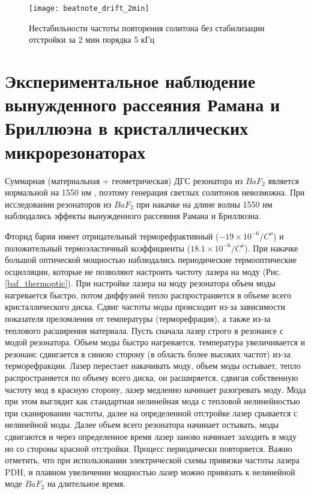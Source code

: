 \begin{figure}[ht]
\centering
  \texttt{[image: beatnote\_drift\_2min]}
  \caption{Нестабильности частоты повторения солитона без стабилизации отстройки за 2 мин порядка 5 кГц}
  \label{beatnote_drift_2min}
\end{figure}



\section{Экспериментальное наблюдение вынужденного рассеяния Рамана и Бриллюэна в кристаллических микрорезонаторах}

Суммарная (материальная + геометрическая) ДГС резонатора из $BaF_2$ является нормальной на 1550 нм \cite{}, поэтому генерация светлых солитонов невозможна. При исследовании резонаторов из $BaF_2$ при накачке на длине волны 1550 нм наблюдались эффекты вынужденного рассеяния Рамана и Бриллюэна.

Фторид бария имеет отрицательный терморефрактивный ($-19\times10^{-6}/C^{o}$) и положительный термоэластичный коэффициенты ($18.1\times10^{-6}/C^{o}$). При накачке большой оптической мощностью наблюдались периодические термооптические осцилляции, которые не позволяют настроить частоту лазера на моду (Рис. \ref{baf_thermoptic}). При настройке лазера на моду резонатора объем моды нагревается быстро, потом диффузией тепло распространяется в объеме всего кристаллического диска. Сдвиг частоты моды происходит из-за зависимости показателя преломления от температуры (терморефрация), а также из-за теплового расширения материала. Пусть сначала лазер строго в резонансе с модой резонатора. Объем моды быстро нагревается, температура увеличивается и резонанс сдвигается в синюю сторону (в область более высоких частот) из-за терморефракции. Лазер перестает накачивать моду, объем моды остывает, тепло распространяется по объему всего диска, он расширяется, сдвигая собственную частоту мод в красную сторону, лазер медленно начинает разогревать моду. Мода при этом выглядит как стандартная нелинейная мода с тепловой нелинейностью при сканировании частоты, далее на определенной отстройке лазер срывается с нелинейной моды. Далее объем всего резонатора начинает остывать, моды сдвигаются и через определенное время лазер заново начинает заходить в моду но со стороны красной отстройки. Процесс периодически повторяется. Важно отметить, что при использовании электрической схемы привязки частоты лазера PDH, и плавном увеличении мощностью лазер можно привязать к нелинейной моде $BaF_2$ на длительное время.

